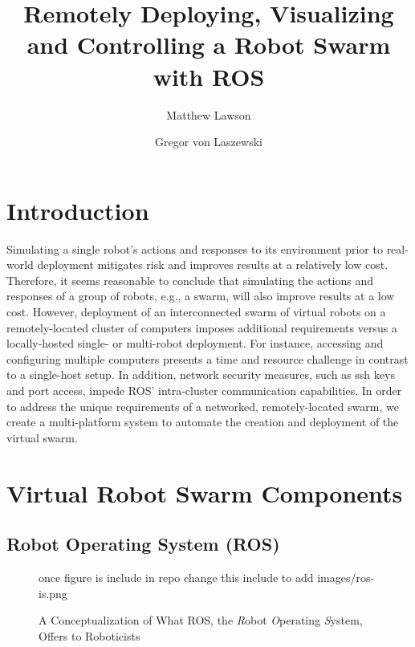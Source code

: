 \documentclass[9pt,twocolumn,twoside]{../../styles/osajnl}
\title{Remotely Deploying, Visualizing and Controlling a Robot Swarm with ROS}
\author[1]{Matthew Lawson}
\author[1,*]{Gregor von Laszewski}
\affil[1]{School of Informatics and Computing, Bloomington, IN 47408, U.S.A.}
\affil[*]{Corresponding authors: laszewski@gmail.com}
\begin{document}
\maketitle

\section{Introduction}
Simulating a single robot's actions and responses to its environment prior to real-world deployment mitigates risk and improves results at a relatively low cost. Therefore, it seems reasonable to conclude that simulating the actions and responses of a group of robots, e.g., a swarm, will also improve results at a low cost.  However, deployment of an interconnected swarm of virtual robots on a remotely-located cluster of computers imposes additional requirements versus a locally-hosted single- or multi-robot deployment.  For instance, accessing and configuring multiple computers presents a time and resource challenge in contrast to a single-host setup.  In addition, network security measures, such as ssh keys and port access, impede ROS' intra-cluster communication capabilities.  In order to address the unique requirements of a networked, remotely-located swarm, we create a multi-platform system to automate the creation and deployment of the virtual swarm. 

\section{Virtual Robot Swarm Components}

\subsection{Robot Operating System (ROS)} %

\begin{figure*}[htbp]
\centering
once figure is include in repo change this include to add images/ros-is.png 
\caption{A Conceptualization of What ROS, the \textit{R}obot \textit{O}perating \textit{S}ystem, Offers to Roboticists \cite{www-ros-ros-is}}
\label{fig:rosOverview}
\end{figure*}
\end{document}
